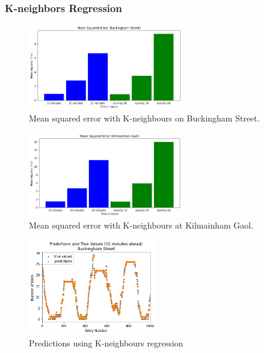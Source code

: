 \subsubsection{K-neighbors Regression}

\begin{figure}[H]
    \centering
    \includegraphics[width=0.6\textwidth]{images/mse3.png}
    \caption{Mean squared error with K-neighbours on Buckingham Street.}
    \end{figure}
\par
\begin{figure}[H]
    \centering
    \includegraphics[width=0.6\textwidth]{images/mse4.png}
    \caption{Mean squared error with K-neighbours at Kilmainham Gaol.}
    \end{figure}
\par
\begin{figure}[H]
    \centering
    \includegraphics[width=0.5\textwidth]{images/preds7.png}
    \caption{Predictions using K-neighbours regression}
    \end{figure}
\par
